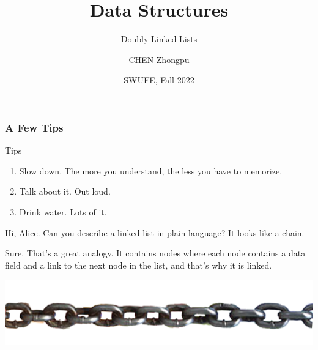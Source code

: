 \documentclass[aspectratio=169, 14pt]{beamer}
\title[Data Structures] %
{Data Structures}
\subtitle{Doubly Linked Lists}
\author[CHEN Zhongpu] %
{CHEN Zhongpu}
\institute[] %
{
  School of Computing and Artificial Intelligence \\
  \href{mailto:zpchen@swufe.edu.cn}{zpchen@swufe.edu.cn}
}
\date[] %
{SWUFE, Fall 2022}
\begin{document}
\frame{\titlepage}


\begin{frame}
    \frametitle{A Few Tips}

    \begin{exampleblock}{Tips}
        \begin{enumerate}
            \item {} Slow down. The more you understand, the less you have to memorize.
            \item {} Talk about it. Out loud.
            \item {} Drink water. Lots of it.
        \end{enumerate}        
    \end{exampleblock}

\end{frame}

\begin{frame}[fragile]
    \begin{leftbubbles}
Hi, Alice. Can you describe a linked list in plain language? It looks like a chain.        
    \end{leftbubbles}
\begin{rightbubbles}
Sure. That's a great analogy. It contains nodes where each node contains a data field and a link to the next node in the list, and that's why it is linked.  
\end{rightbubbles}

\includegraphics[width=.5\textwidth]{week6/chain}


\end{frame}
\end{document}
